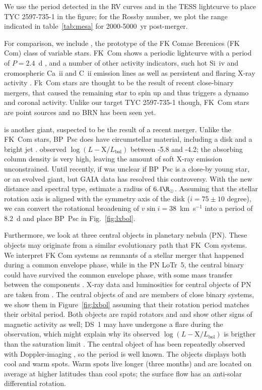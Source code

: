 \documentclass[]{aastex631}
\begin{document}
We use the period detected in the RV curves and in the TESS lightcurve to place TYC 2597-735-1 in the figure; for the Rossby number, we plot the range indicated in table~\ref{tab:mesa} for 2000-5000~yr post-merger.

For comparison, we include , the prototype of the FK Comae Berenices (FK Com) class of variable stars. FK~Com shows a periodic lightcurve with a period of $P=2.4$~d \citep{1993A&A...278..449J}, and a number of other activity indicators, such hot Si~{\sc iv} and cromospheric Ca~{\sc ii} and C~{\sc ii} emission lines as well as persistent and flaring X-ray activity \citep{2016ApJS..223....5A}. Fk~Com stars are thought to be the result of recent close-binary mergers, that caused the remaining star to spin up and thus triggers a dynamo and coronal activity. Unlike our target TYC 2597-735-1 though, FK~Com stars are point sources and no BRN has been seen yet.

 is another giant, suspected to be the result of a recent merger. Unlike the FK~Com stars, BP~Psc does have circumstellar material, including a disk and a bright jet \citep{2008ApJ...683.1085Z}.
\citet{2010ApJ...719L..65K} observed $\log(L-\mathrm{X}/L_\mathrm{bol})$ between -5.8 and -4.2; the absorbing column density is very high, leaving the amount of soft X-ray emission unconstrained. Until recently, if was unclear if BP~Psc is a close-by young star, or an evolved giant, but GAIA data has resolved this controversy. With the new distance and spectral type, \citet{2019MNRAS.490.3158C} estimate a radius of $6.4\R_\sun{}$. Assuming that the stellar rotation axis is aligned with the symmetry axis of the disk ($i=75\pm10$ degree), we can convert the rotational broadening of $v \sin i=38$~km~s$^{-1}$ \citet{2008ApJ...683.1085Z} into a period of 8.2~d and place BP~Psc in Fig.~\ref{fig:lxbol}.

Furthermore, we look at three central objects in planetary nebula (PN). These objects may originate from a similar evolutionary path that FK~Com systems. We interpret FK Com systems as remnants of a stellar merger that happened during a common envelope phase, while in the PN LoTr~5, the central binary could have survived the common envelope phase, with some mass transfer between the components \citep{1996A&A...307..200J}.
X-ray data and luminosities for central objects of PN are taken from \citet{2010ApJ...721.1820M}. The central objects of  and  are members of close binary systems, we show them in Figure~\ref{fig:lxbol} assuming that their rotation period matches their orbital period. Both objects are rapid rotators and and show other signs of magnetic activity as well; DS~1 may have undergone a flare during the observation, which might explain why its observed $\log(L-\mathrm{X}/L_\mathrm{bol})$ is brigther than the saturation limit \citep{2010ApJ...721.1820M}. The central object of  has been repeatedly observed with Doppler-imaging \citep{2019A&A...624A..83K}, so the period is well known. The objects displays both cool and warm spots. Warm spots live longer (three months) and are located on average at higher latitudes than cool spots; the surface flow has an anti-solar differential rotation.
\end{document}
